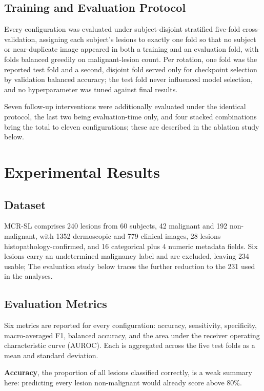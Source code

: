 \documentclass[conference]{IEEEtran}
\begin{document}
\subsection{Training and Evaluation Protocol}
Every configuration was evaluated under subject-disjoint stratified five-fold cross-validation, assigning each subject's lesions to exactly one fold so that no subject or near-duplicate image appeared in both a training and an evaluation fold, with folds balanced greedily on malignant-lesion count. Per rotation, one fold was the reported test fold and a second, disjoint fold served only for checkpoint selection by validation balanced accuracy; the test fold never influenced model selection, and no hyperparameter was tuned against final results.

Seven follow-up interventions were additionally evaluated under the identical protocol, the last two being evaluation-time only, and four stacked combinations bring the total to eleven configurations; these are described in the ablation study below.

\section{Experimental Results}

\subsection{Dataset}
\label{sec:dataset}
MCR-SL \cite{mcrsl} comprises 240 lesions from 60 subjects, 42 malignant and 192 non-malignant, with 1352 dermoscopic and 779 clinical images, 28 lesions histopathology-confirmed, and 16 categorical plus 4 numeric metadata fields. Six lesions carry an undetermined malignancy label and are excluded, leaving 234 usable; The evaluation study below traces the further reduction to the 231 used in the analyses.

\subsection{Evaluation Metrics}
Six metrics are reported for every configuration: accuracy, sensitivity, specificity, macro-averaged F1, balanced accuracy, and the area under the receiver operating characteristic curve (AUROC). Each is aggregated across the five test folds as a mean and standard deviation.

\textbf{Accuracy}, the proportion of all lesions classified correctly, is a weak summary here: predicting every lesion non-malignant would already score above $80\%$.
\end{document}
